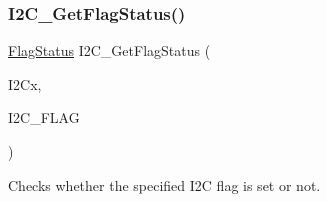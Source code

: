 \subsubsection{\texorpdfstring{I2\+C\+\_\+\+Get\+Flag\+Status()}{I2C\_GetFlagStatus()}}
{\footnotesize\ttfamily \hyperlink{group___exported__types_ga89136caac2e14c55151f527ac02daaff}{Flag\+Status} I2\+C\+\_\+\+Get\+Flag\+Status (\begin{DoxyParamCaption}\item[{\hyperlink{struct_i2_c___type_def}{I2\+C\+\_\+\+Type\+Def} $\ast$}]{I2\+Cx,  }\item[{uint32\+\_\+t}]{I2\+C\+\_\+\+F\+L\+AG }\end{DoxyParamCaption})}



Checks whether the specified I2C flag is set or not. 

